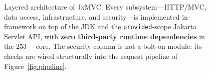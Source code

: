 \begin{figure}[tb]
{}
  \caption{Layered architecture of JxMVC. Every subsystem---HTTP/MVC,
    data access, infrastructure, and security---is implemented in-framework
    on top of the JDK and the \texttt{provided}-scope Jakarta Servlet API,
    with \textbf{zero third-party runtime dependencies} in the
    \SI{253}{\kilo\byte} core. The security column is not a bolt-on module:
    its checks are wired structurally into the request pipeline of
    Figure~\ref{fig:pipeline}.}
  \label{fig:architecture}
\end{figure}